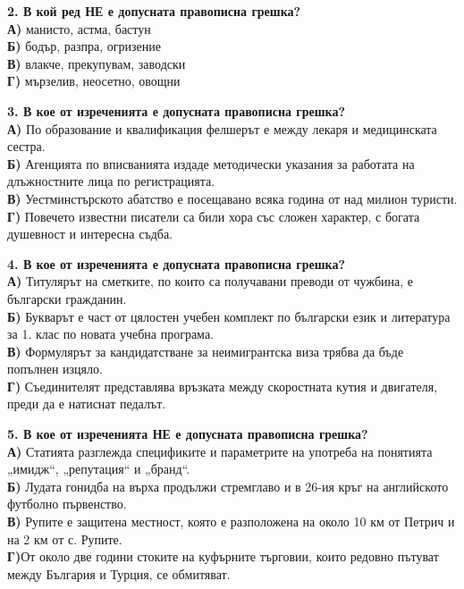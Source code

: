 \documentclass[12pt,a4paper]{article}
\begin{document}
\vspace{0.6cm}

\noindent
\textbf{2. В кой ред НЕ е допусната правописна грешка?} \\
\noindent
\textbf{А)} манисто, астма, бастун \\
\textbf{Б)} бодър, разпра, огризение \\
\textbf{В)} влакче, прекупувам, заводски \\
\textbf{Г)} мързелив, неосетно, овощни

\vspace{0.6cm}

\noindent
\textbf{3. В кое от изреченията е допусната правописна грешка?} \\
\noindent
\textbf{А)} По образование и квалификация фелшерът е между лекаря и медицинската сестра. \\
\textbf{Б)} Агенцията по вписванията издаде методически указания за работата на длъжностните лица по регистрацията. \\
\textbf{В)} Уестминстърското абатство е посещавано всяка година от над милион туристи. \\
\textbf{Г)} Повечето известни писатели са били хора със сложен характер, с богата душевност и интересна съдба.

\vspace{0.6cm}

\noindent
\textbf{4. В кое от изреченията е допусната правописна грешка?} \\
\noindent
\textbf{А)} Титулярът на сметките, по които са получавани преводи от чужбина, е български гражданин. \\
\textbf{Б)} Букварът е част от цялостен учебен комплект по български език и литература за 1. клас по новата учебна програма. \\
\textbf{В)} Формулярът за кандидатстване за неимигрантска виза трябва да бъде попълнен изцяло. \\
\textbf{Г)} Съединителят представлява връзката между скоростната кутия и двигателя, преди да е натиснат педалът.

\vspace{0.6cm}

\noindent
\textbf{5. В кое от изреченията НЕ е допусната правописна грешка?} \\
\noindent
\textbf{А)} Статията разглежда спецификите и параметрите на употреба на понятията „имидж“, „репутация“ и „бранд“. \\
\textbf{Б)} Лудата гонидба на върха продължи стремглаво и в 26-ия кръг на английското футболно първенство. \\
\textbf{В)} Рупите е защитена местност, която е разположена на около 10 км от Петрич и на 2 км от с. Рупите. \\
\textbf{Г)}От около две години стоките на куфърните търговии, които редовно пътуват между България и Турция, се обмитяват.
\end{document}
